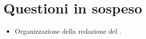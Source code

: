\documentclass[../verbale-2017-03-20.tex]{subfiles}
\begin{document}
	\section{Questioni in sospeso} 
	\begin{itemize}
		\item Organizzazione della redazione del \pianodiprogettoRQ.
	\end{itemize}
\end{document}
